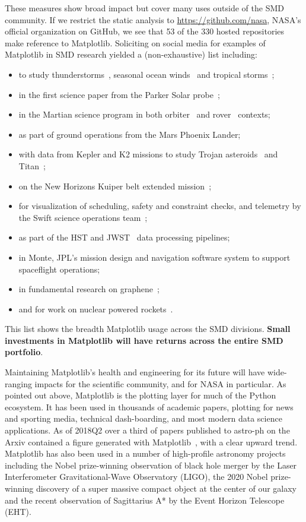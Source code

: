 \documentclass[12pt]{article}
\numberwithin{page}{section}
\begin{document}
These measures show broad impact but cover many uses outside of the
SMD community.  If we restrict the static analysis to
\url{https://github.com/nasa}, NASA's official organization on GitHub,
we see that 53 of the 330 hosted repositories make reference to
Matplotlib.  Soliciting on social media for examples of Matplotlib in SMD research
yielded a (non-exhaustive) list including:
\begin{itemize}[noitemsep]
\item
  to study
  thunderstorms~\cite{https://doi.org/10.1002/2016JD025299,https://doi.org/10.1029/2019JD030874},
  seasonal ocean winds~\cite{https://doi.org/10.1002/2017JD027516} and
  tropical storms~\cite{Lang_2020};
\item in the first science paper from the Parker Solar
  probe~\cite{Bale2019};
\item in the Martian science program in both
  orbiter~\cite{https://doi.org/10.1029/2019JE006188} and
  rover~\cite{https://doi.org/10.1002/2016EA000219} contexts;
\item as part of ground operations from the Mars Phoenix Lander;
\item with data from Kepler and K2 missions to study Trojan
  asteroids~\cite{Nixon_2019} and
  Titan~\cite{Ryan_2017,2019PASP..131h4505P};
\item on the New Horizons Kuiper belt extended
  mission~\cite{Porter_2018};
\item for visualization of scheduling, safety and constraint checks,
  and telemetry by the Swift science operations
  team~\cite{swift_ops,2020ApJ...900...35T};
\item as part of the HST and JWST~\cite{jwst_pipeline} data processing
  pipelines;
\item in Monte, JPL's mission design
  and navigation software system to support spaceflight operations;
\item in fundamental research on graphene~\cite{PhysRevLett.120.236802};
\item and for work on nuclear powered rockets~\cite{leu_cerment}.
\end{itemize}
This list shows the breadth Matplotlib usage across the SMD
divisions.  \textbf{Small investments in Matplotlib will have returns across
the entire SMD portfolio}.

Maintaining Matplotlib's health and engineering for its future will
have wide-ranging impacts for the scientific community, and for NASA in
particular.  As pointed out above, Matplotlib is the plotting layer
for much of the Python ecosystem.  It has been used in thousands of
academic papers, plotting for news and sporting media, technical
dash-boarding, and most modern data science applications.  As of
2018Q2 over a third of papers published to astro-ph on the Arxiv
contained a figure generated with
Matplotlib~\cite{arxvi_stats},
with a clear upward trend.  Matplotlib has also been used in a number
of high-profile astronomy projects including the Nobel prize-winning
observation of black hole merger by the Laser Interferometer
Gravitational-Wave Observatory (LIGO), the 2020 Nobel prize-winning
discovery of a super massive compact object at the center of our
galaxy and the recent observation of Sagittarius A* by the Event
Horizon Telescope (EHT).
\end{document}
